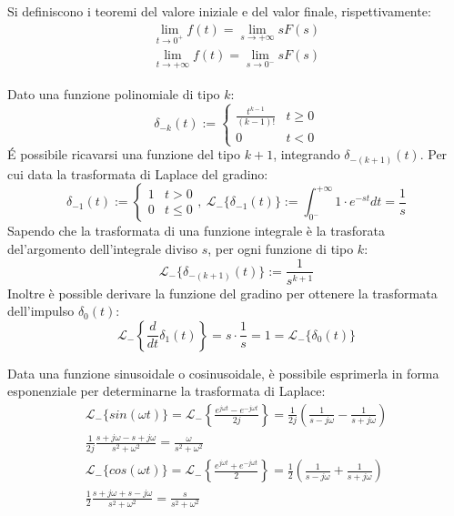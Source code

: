 \documentclass{article}
\numberwithin{equation}{subsection}
\begin{document}
Si definiscono i teoremi del valore iniziale e del valor finale, rispettivamente:
\begin{gather}
    \lim_{t\to0^+}f(t)=\lim_{s\to+\infty}sF(s)\\
    \lim_{t\to+\infty}f(t)=\lim_{s\to0^-}sF(s)
\end{gather}

Dato una funzione polinomiale di tipo $k$:
\begin{equation}
    \delta_{-k}(t):=
    \begin{cases}
        \displaystyle\frac{t^{k-1}}{(k-1)!}&t\geq0\\
        0&t<0
    \end{cases}
\end{equation}
\'{E} possibile ricavarsi una funzione del tipo $k+1$, integrando $\delta_{-(k+1)}(t)$. Per cui data la trasformata di Laplace del gradino:
\begin{equation}
    \delta_{-1}(t):=
    \begin{cases}
        1 &t>0\\
        0 &t\leq0
    \end{cases},\:
    \mathscr{L}_-\{\delta_{-1}(t)\}:=\displaystyle\int_{0^-}^{+\infty}1\cdot e^{-st}dt=\frac{1}{s}
\end{equation}
Sapendo che la trasformata di una funzione integrale è la trasforata del'argomento dell'integrale diviso $s$, per ogni funzione di tipo $k$:
\begin{equation}
    \mathscr{L}_-\{\delta_{-(k+1)}(t)\}:=\displaystyle\frac{1}{s^{k+1}}
\end{equation}
Inoltre è possible derivare la funzione del gradino per ottenere la trasformata dell'impulso $\delta_0(t)$:
\begin{equation}
    \mathscr{L}_-\left\{\displaystyle\frac{d}{dt}\delta_1(t)\right\}=s\cdot\frac{1}{s}=1=\mathscr{L}_-\{\delta_0(t)\}
\end{equation}

Data una funzione sinusoidale o cosinusoidale, è possibile esprimerla in forma esponenziale per determinarne la trasformata di Laplace:
\begin{gather}
    \mathscr{L}_-\{sin(\omega t)\}=\mathscr{L}_-\left\{\displaystyle\frac{e^{j\omega t}-e^{-j\omega t}}{2j}\right\}=\frac{1}{2j}\left(\frac{1}{s-j\omega}-\frac{1}{s+j\omega}\right)\\
    \displaystyle\frac{1}{2j}\frac{s+j\omega-s+j\omega}{s^2+\omega^2}=\frac{\omega}{s^2+\omega^2}\\
    \mathscr{L}_-\{cos(\omega t)\}=\mathscr{L}_-\left\{\displaystyle\frac{e^{j\omega t}+e^{-j\omega t}}{2}\right\}=\frac{1}{2}\left(\frac{1}{s-j\omega}+\frac{1}{s+j\omega}\right)\\
    \displaystyle\frac{1}{2}\frac{s+j\omega+s-j\omega}{s^2+\omega^2}=\frac{s}{s^2+\omega^2}
\end{gather}
\end{document}
